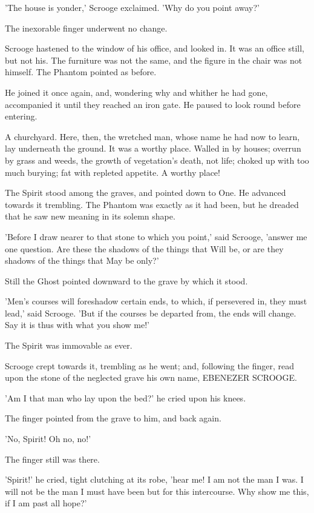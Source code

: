 'The house is yonder,' Scrooge exclaimed. 'Why do you point away?'

The inexorable finger underwent no change.

Scrooge hastened to the window of his office, and looked in. It was an
office still, but not his. The furniture was not the same, and the
figure in the chair was not himself. The Phantom pointed as before.

He joined it once again, and, wondering why and whither he had gone,
accompanied it until they reached an iron gate. He paused to look round
before entering.

A churchyard. Here, then, the wretched man, whose name he had now to
learn, lay underneath the ground. It was a worthy place. Walled in by
houses; overrun by grass and weeds, the growth of vegetation's death,
not life; choked up with too much burying; fat with repleted appetite. A
worthy place!

The Spirit stood among the graves, and pointed down to One. He advanced
towards it trembling. The Phantom was exactly as it had been, but he
dreaded that he saw new meaning in its solemn shape.

'Before I draw nearer to that stone to which you point,' said Scrooge,
'answer me one question. Are these the shadows of the things that Will
be, or are they shadows of the things that May be only?'

Still the Ghost pointed downward to the grave by which it stood.

'Men's courses will foreshadow certain ends, to which, if persevered in,
they must lead,' said Scrooge. 'But if the courses be departed from, the
ends will change. Say it is thus with what you show me!'

The Spirit was immovable as ever.

Scrooge crept towards it, trembling as he went; and, following the
finger, read upon the stone of the neglected grave his own name,
EBENEZER SCROOGE.

'Am I that man who lay upon the bed?' he cried upon his knees.

The finger pointed from the grave to him, and back again.

'No, Spirit! Oh no, no!'

The finger still was there.

'Spirit!' he cried, tight clutching at its robe, 'hear me! I am not the
man I was. I will not be the man I must have been but for this
intercourse. Why show me this, if I am past all hope?'

